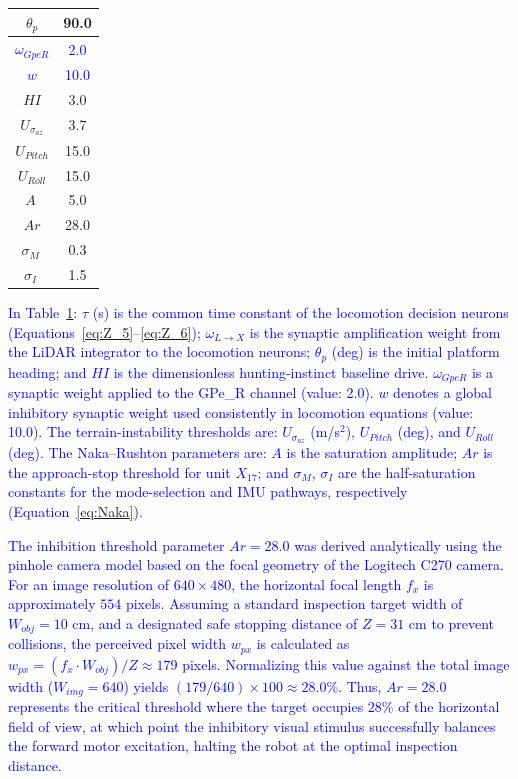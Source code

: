 \documentclass[preprint,12pt]{elsarticle}
\newcommand{\revblue}[1]{\textcolor{blue}{#1}}
\begin{document}
\begin{table}[t]
\begin{tabular}{|c|c|}
$\theta_{p}$ & 90.0 \\ \hline

\revblue{$\omega_{GpeR}$} & \revblue{2.0} \\ \hline
\revblue{$w$} & \revblue{10.0} \\ \hline

$HI$ & 3.0 \\ \hline

$U_{\sigma_{az}}$ & 3.7 \\ \hline
$U_{Pitch}$ & 15.0 \\ \hline
$U_{Roll}$ & 15.0 \\ \hline
$A\ $ & 5.0 \\ \hline
$ Ar $ & 28.0 \\ \hline
$\sigma_{M}\ $ & 0.3 \\ \hline
$\sigma_{I}\ $ & 1.5 \\ \hline
\end{tabular}
\label{table:Locom_NN}
\end{table}

\revblue{In Table~\ref{table:Locom_NN}: $\tau$ (s) is the common time constant of the locomotion decision neurons (Equations~\eqref{eq:Z_5}--\eqref{eq:Z_6}); $\omega_{L\rightarrow X}$ is the synaptic amplification weight from the LiDAR integrator to the locomotion neurons; $\theta_{p}$ (deg) is the initial platform heading; and $HI$ is the dimensionless hunting-instinct baseline drive.
$\omega_{GpeR}$ is a synaptic weight applied to the GPe\_R channel (value: 2.0).
$w$ denotes a global inhibitory synaptic weight used consistently in locomotion equations (value: 10.0).
The terrain-instability thresholds are: $U_{\sigma_{az}}$ (m/s$^2$), $U_{Pitch}$ (deg), and $U_{Roll}$ (deg).
The Naka--Rushton parameters are: $A$ is the saturation amplitude; $Ar$ is the approach-stop threshold for unit $X_{17}$; and $\sigma_{M}$, $\sigma_{I}$ are the half-saturation constants for the mode-selection and IMU pathways, respectively (Equation~\eqref{eq:Naka}).}

\revblue{The inhibition threshold parameter $Ar = 28.0$ was derived analytically using the pinhole camera model based on the focal geometry of the Logitech C270 camera. For an image resolution of $640 \times 480$, the horizontal focal length $f_x$ is approximately $554$ pixels. Assuming a standard inspection target width of $W_{obj} = 10$ cm, and a designated safe stopping distance of $Z = 31$ cm to prevent collisions, the perceived pixel width $w_{px}$ is calculated as $w_{px} = (f_x \cdot W_{obj}) / Z \approx 179$ pixels. Normalizing this value against the total image width ($W_{img} = 640$) yields $(179 / 640) \times 100 \approx 28.0\%$. Thus, $Ar = 28.0$ represents the critical threshold where the target occupies $28\%$ of the horizontal field of view, at which point the inhibitory visual stimulus successfully balances the forward motor excitation, halting the robot at the optimal inspection distance.}
\end{document}
